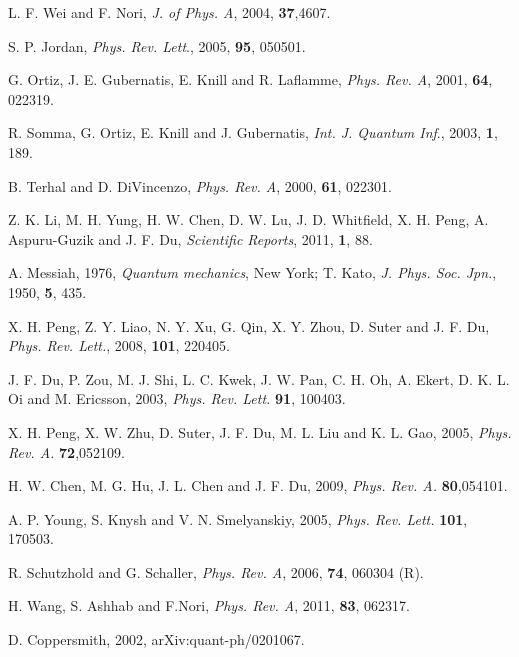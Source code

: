 \documentclass[8.5pt,twoside,twocolumn]{article}
\begin{document}
\begin{thebibliography}{99}
L. F. Wei and F. Nori, \emph{J. of Phys. A}, 2004, \textbf{37},4607.

S. P. Jordan, \emph{Phys. Rev. Lett}., 2005, \textbf{95}, 050501.

G. Ortiz, J. E. Gubernatis, E. Knill and R. Laflamme, \emph{Phys. Rev. A}, 2001, \textbf{64}, 022319.

R. Somma, G. Ortiz, E. Knill and J. Gubernatis, \emph{Int. J. Quantum Inf}., 2003, \textbf{1}, 189.

B. Terhal and D. DiVincenzo, \emph{Phys. Rev. A}, 2000, \textbf{61}, 022301.

Z. K. Li, M. H. Yung, H. W. Chen, D. W. Lu, J. D. Whitfield, X. H. Peng, A. Aspuru-Guzik and J. F. Du, \emph{Scientific Reports}, 2011, \textbf{1}, 88.

A. Messiah, 1976, \emph{Quantum mechanics}, New York; T. Kato, {\it J. Phys. Soc. Jpn.}, 1950, \textbf{5}, 435.

X. H. Peng, Z. Y. Liao, N. Y. Xu, G. Qin, X. Y. Zhou, D. Suter and J. F. Du, \emph{Phys. Rev. Lett.}, 2008, \textbf{101}, 220405.

 J. F. Du, P. Zou, M. J. Shi, L. C. Kwek, J. W. Pan, C. H. Oh, A. Ekert, D. K. L. Oi and M. Ericsson, 2003, {\it Phys. Rev. Lett.} \textbf{91}, 100403.

 X. H. Peng, X. W. Zhu, D. Suter, J. F. Du, M. L. Liu and K. L. Gao, 2005, {\it Phys. Rev. A.} \textbf{72},052109.

 H. W. Chen, M. G. Hu, J. L. Chen and J. F. Du, 2009, {\it Phys. Rev. A.} \textbf{80},054101.


 A. P. Young, S. Knysh and V. N. Smelyanskiy, 2005, {\it Phys. Rev.
Lett.} \textbf{101}, 170503.

 R. Schutzhold and G. Schaller, \emph{Phys. Rev. A}, 2006, \textbf{74}, 060304
(R).

 H. Wang, S. Ashhab and F.Nori, \emph{Phys. Rev. A}, 2011, \textbf{83}, 062317.


D. Coppersmith, 2002, arXiv:quant-ph/0201067.


\end{thebibliography}
\end{document}
